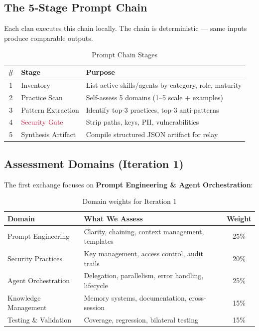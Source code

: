 \documentclass[11pt,a4paper]{article}
\begin{document}
\subsection{The 5-Stage Prompt Chain}

Each clan executes this chain locally. The chain is deterministic ---
same inputs produce comparable outputs.

\begin{table}[h]
\centering
\begin{tabularx}{\textwidth}{c l X}
\toprule
\textbf{\#} & \textbf{Stage} & \textbf{Purpose} \\
\midrule
1 & Inventory & List active skills/agents by category, role, maturity \\
2 & Practice Scan & Self-assess 5 domains (1--5 scale + examples) \\
3 & Pattern Extraction & Identify top-3 practices, top-3 anti-patterns \\
4 & \textcolor{crimson}{Security Gate} & Strip paths, keys, PII, vulnerabilities \\
5 & Synthesis Artifact & Compile structured JSON artifact for relay \\
\bottomrule
\end{tabularx}
\caption{Prompt Chain Stages}
\end{table}

\subsection{Assessment Domains (Iteration 1)}

The first exchange focuses on \textbf{Prompt Engineering \& Agent
Orchestration}:

\begin{table}[h]
\centering
\begin{tabularx}{\textwidth}{l X c}
\toprule
\textbf{Domain} & \textbf{What We Assess} & \textbf{Weight} \\
\midrule
Prompt Engineering & Clarity, chaining, context management, templates & 25\% \\
Security Practices & Key management, access control, audit trails & 20\% \\
Agent Orchestration & Delegation, parallelism, error handling, lifecycle & 25\% \\
Knowledge Management & Memory systems, documentation, cross-session & 15\% \\
Testing \& Validation & Coverage, regression, bilateral testing & 15\% \\
\bottomrule
\end{tabularx}
\caption{Domain weights for Iteration 1}
\end{table}
\end{document}
